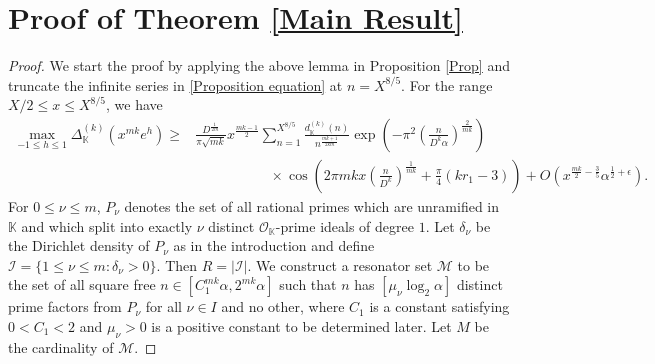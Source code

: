 \documentclass[reqno]{amsart}
\numberwithin{equation}{section}
\theoremstyle{plain}
\begin{document}
       
       
       
       









\section{Proof of Theorem \ref{Main Result} }
          \begin{proof}
  We start the proof by applying the above lemma in Proposition \ref{Prop} and truncate the infinite series in \eqref{Proposition equation}  at $n=X^{8/5}$. For the range $X/2\leq x\leq X^{8/5}$, we have
\begin{align}\label{Main inequality of proof}
	\max_{-1\leq h\leq 1} \Delta_{\mathbb{K}}^{(k)}\left(x^{mk}e^h\right) \geq &\frac{D^{\frac{1}{2m}}}{\pi \sqrt{mk}}x^{\frac{mk-1}{2}} \sum_{n=1}^{X^{8/5}} \frac{d_{\mathbb{K}}^{(k)}(n)}{n^{\frac{mk+1}{2km}}}\exp\left( -\pi^2\left(\frac{n}{D^k\alpha}\right)^{\frac{2}{mk}}\right)\\
	& \nonumber \ \ \ \ \ \ \ \ \ \ \ \ \ \ \ \ \ \ \ \ \ \ \ \ \times \cos\left(2\pi mk x \left(\frac{n}{D^k}\right)^{\frac{1}{mk}}+ \frac{\pi}{4}(kr_1-3)\right)
	+ O\left(x^{\frac{mk}{2}-\frac{3}{5}}\alpha^{\frac{1}{2}+\epsilon}\right).
\end{align} 
For  $0\leq \nu \leq m$,  $P_{\nu}$ denotes the set of all rational primes which are unramified in $\mathbb{K}$ and which split into exactly $\nu$ distinct $\mathcal{O}_{\mathbb{K}}$-prime ideals of degree $1$. Let $\delta_{\nu}$ be the Dirichlet density of $P_{\nu}$ as in the introduction and define $\mathcal{I}=\{1\leq \nu \leq m: \delta_{\nu}>0\}$. Then $R=|\mathcal{I}|$. We construct a resonator set $\mathcal{M}$ to be the set of all square free  $n\in [C_1^{mk}\alpha, 2^{mk}\alpha]$ such that $n$ has $[\mu_{\nu}\log_2 \alpha]$ distinct prime factors from $P_{\nu}$ for all $\nu \in I$ and no other, where $C_1$ is a constant satisfying $0<C_1<2$ and $\mu_{\nu} > 0$ is a positive constant to be determined later. Let $M$ be the cardinality of $\mathcal{M}$.


\end{proof}
\end{document}
